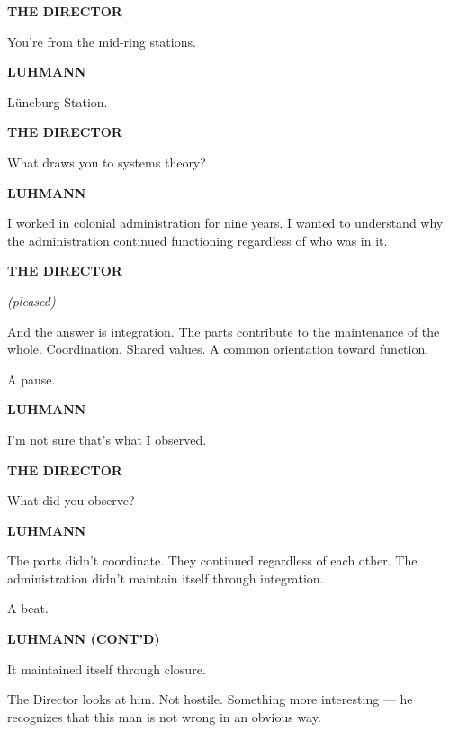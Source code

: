 \documentclass[12pt]{article}
\newcommand{\character}[1]{%
  \vspace{8pt}%
  \begin{center}\textbf{#1}\end{center}%
  \vspace{-4pt}%
}
\newcommand{\paren}[1]{%
  \begin{center}\textit{(#1)}\end{center}%
  \vspace{-4pt}%
}
\newenvironment{dialogue}{%
  \begin{center}%
  \begin{minipage}{0.62\textwidth}%
}{%
  \end{minipage}%
  \end{center}%
  \vspace{4pt}%
}
\newenvironment{action}{%
  \vspace{4pt}%
  \noindent\ignorespaces%
}{%
  \vspace{6pt}%
}
\begin{document}
\character{THE DIRECTOR}
\begin{dialogue}
You're from the mid-ring stations.
\end{dialogue}

\character{LUHMANN}
\begin{dialogue}
Lüneburg Station.
\end{dialogue}

\character{THE DIRECTOR}
\begin{dialogue}
What draws you to systems theory?
\end{dialogue}

\character{LUHMANN}
\begin{dialogue}
I worked in colonial administration for nine years. I wanted to understand why the administration continued functioning regardless of who was in it.
\end{dialogue}

\character{THE DIRECTOR}
\paren{pleased}
\begin{dialogue}
And the answer is integration. The parts contribute to the maintenance of the whole. Coordination. Shared values. A common orientation toward function.
\end{dialogue}

\begin{action}
A pause.
\end{action}

\character{LUHMANN}
\begin{dialogue}
I'm not sure that's what I observed.
\end{dialogue}

\character{THE DIRECTOR}
\begin{dialogue}
What did you observe?
\end{dialogue}

\character{LUHMANN}
\begin{dialogue}
The parts didn't coordinate. They continued regardless of each other. The administration didn't maintain itself through integration.
\end{dialogue}

\begin{action}
A beat.
\end{action}

\character{LUHMANN (CONT'D)}
\begin{dialogue}
It maintained itself through closure.
\end{dialogue}

\begin{action}
The Director looks at him. Not hostile. Something more interesting — he recognizes that this man is not wrong in an obvious way.
\end{action}
\end{document}
